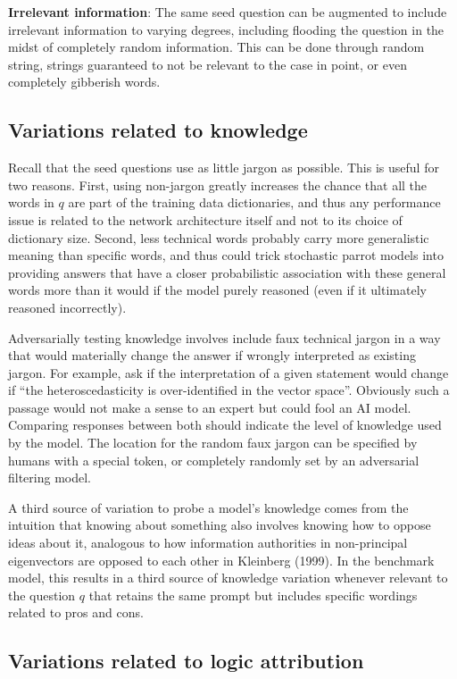 \documentclass[
]{article}
\begin{document}
\textbf{Irrelevant information}: The same seed question can be augmented
to include irrelevant information to varying degrees, including flooding
the question in the midst of completely random information. This can be
done through random string, strings guaranteed to not be relevant to the
case in point, or even completely gibberish words.

\subsection{Variations related to
knowledge}\label{variations-related-to-knowledge}

Recall that the seed questions use as little jargon as possible. This is
useful for two reasons. First, using non-jargon greatly increases the
chance that all the words in \(q\) are part of the training data
dictionaries, and thus any performance issue is related to the network
architecture itself and not to its choice of dictionary size. Second,
less technical words probably carry more generalistic meaning than
specific words, and thus could trick stochastic parrot models into
providing answers that have a closer probabilistic association with
these general words more than it would if the model purely reasoned
(even if it ultimately reasoned incorrectly).

Adversarially testing knowledge involves include faux technical jargon
in a way that would materially change the answer if wrongly interpreted
as existing jargon. For example, ask if the interpretation of a given
statement would change if ``the heteroscedasticity is over-identified in
the vector space''. Obviously such a passage would not make a sense to
an expert but could fool an AI model. Comparing responses between both
should indicate the level of knowledge used by the model. The location
for the random faux jargon can be specified by humans with a special
token, or completely randomly set by an adversarial filtering model.

A third source of variation to probe a model's knowledge comes from the
intuition that knowing about something also involves knowing how to
oppose ideas about it, analogous to how information authorities in
non-principal eigenvectors are opposed to each other in Kleinberg
(1999). In the benchmark model, this results in a third source of
knowledge variation whenever relevant to the question \(q\) that retains
the same prompt but includes specific wordings related to pros and cons.

\subsection{Variations related to logic
attribution}\label{variations-related-to-logic-attribution}
\end{document}
